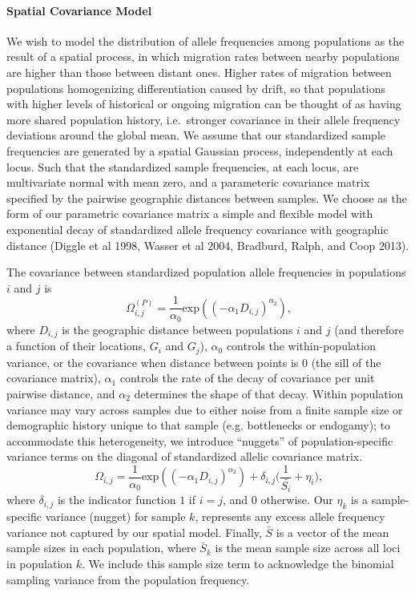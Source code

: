 \documentclass[12pt]{article}
\begin{document}
\paragraph{Spatial Covariance Model}
We wish to model the distribution of allele frequencies  among populations as the result of a spatial process, in which migration rates between nearby populations are higher than those between distant ones.  Higher rates of migration between populations homogenizing differentiation caused by drift, so that populations with higher levels of historical or ongoing migration can be thought of as having more shared population history, i.e.\ stronger covariance in their allele frequency deviations around the global mean. We assume that our standardized sample frequencies are generated by a spatial Gaussian process, independently at each locus. Such that the standardized sample frequencies, at each locus, are multivariate normal with mean zero, and a parameteric covariance matrix specified by the pairwise geographic distances between samples. We choose as the form of our parametric covariance matrix a simple and flexible model with exponential decay of standardized allele frequency covariance with geographic distance (Diggle et al 1998, Wasser et al 2004, Bradburd, Ralph, and Coop 2013).

The covariance between standardized population allele frequencies in populations $i$ and $j$ is 
\begin{equation}
\label{eq:spatial_covariance}
\Omega^{(P)}_{i,j} = \frac{1}{\alpha_0} \text{exp} \left(	\left( -\alpha_1D_{i,j} \right)^{\alpha_2} \right) \text{,}
\end{equation}
where $D_{i,j}$ is the geographic distance between populations $i$ and $j$ (and therefore a function of their locations, $G_i$ and $G_j$), $\alpha_0$ controls the within-population variance, or the covariance when distance between points is 0 (the sill of the covariance matrix),  $\alpha_1$ controls the rate of the decay of covariance per unit pairwise distance, and $\alpha_2$ determines the shape of that decay.  Within population variance may vary across samples due to either noise from a finite sample size or demographic history unique to that sample (e.g. bottlenecks or endogamy); to accommodate this heterogeneity, we introduce ``nuggets'' of population-specific variance terms on the diagonal of standardized allelic covariance matrix.  
\begin{equation}
\label{eq:spatial_covariance2}
\Omega_{i,j} = \frac{1}{\alpha_0} \text{exp} \left(	\left( -\alpha_1D_{i,j} \right)^{\alpha_2} \right) + \delta_{i,j} \big(\frac{1}{\bar{S_{i}}} + \eta_{i} \big) \text{,}
\end{equation} 
where $\delta_{i,j}$ is the indicator function $1$ if $i=j$, and $0$ otherwise. Our $\eta_k$ is a sample-specific variance (nugget) for sample $k$, represents any excess allele frequency variance not captured by our spatial model. Finally, $\bar{S}$ is a vector of the mean sample sizes in each population, where $\bar{S}_k$ is the mean sample size across all loci in population $k$.  We include this sample size term to acknowledge the binomial sampling variance from the population frequency.
\end{document}
